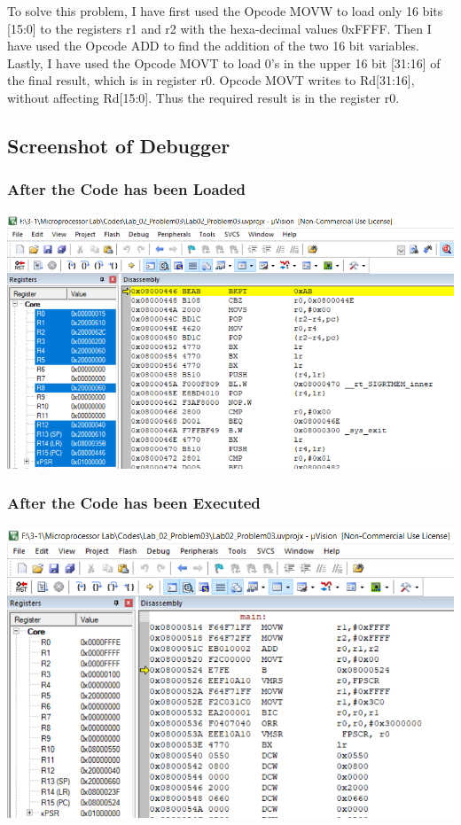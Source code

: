 \documentclass{article}
\begin{document}
To solve this problem, I have first used the Opcode MOVW to load only 16 bits [15:0] to the registers r1 and r2 with the hexa-decimal values 0xFFFF. Then I have used the Opcode ADD to find the addition of the two 16 bit variables. Lastly, I have used the Opcode MOVT to load 0's in the upper 16 bit [31:16] of the final result, which is in register r0. Opcode MOVT writes to Rd[31:16], without affecting Rd[15:0]. Thus the required result is in the register r0.

\subsection{Screenshot of Debugger}

\subsubsection{After the Code has been Loaded}
\begin{center}
    \includegraphics[width=1.1\textwidth]{problem03_01.png}
\end{center}

\subsubsection{After the Code has been Executed}
\begin{center}
    \includegraphics[width=1.1\textwidth]{problem03_02.png}
\end{center}
\end{document}
